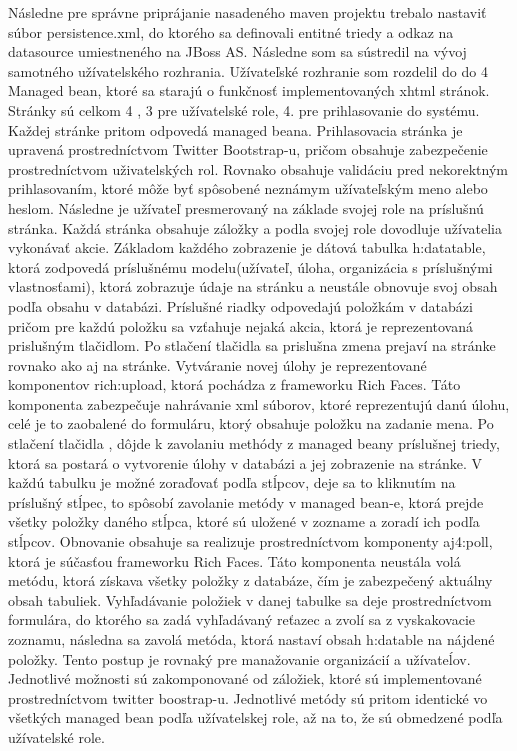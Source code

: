   Následne pre správne priprájanie nasadeného maven projektu trebalo nastaviť súbor persistence.xml, do ktorého sa definovali entitné triedy a odkaz na datasource umiestneného na JBoss AS. Následne som sa sústredil na vývoj samotného užívatelského rozhrania. Užívateľské rozhranie som rozdelil do do 4 Managed bean, ktoré sa starajú o funkčnosť implementovaných xhtml stránok. Stránky sú celkom 4 , 3 pre užívatelské role, 4. pre prihlasovanie do systému. Každej stránke pritom odpovedá managed beana. Prihlasovacia stránka je upravená prostredníctvom Twitter Bootstrap-u, pričom obsahuje zabezpečenie prostredníctvom uživatelských rol. Rovnako obsahuje validáciu pred nekorektným prihlasovaním, ktoré môže byť spôsobené neznámym užívateľským meno alebo heslom. Následne je užívateľ presmerovaný na základe svojej role na príslušnú stránka. Každá stránka obsahuje záložky a podla svojej role dovodluje užívatelia vykonávať akcie. Základom každého zobrazenie je dátová tabulka h:datatable, ktorá zodpovedá príslušnému modelu(užívateľ, úloha, organizácia s príslušnými vlastnosťami), ktorá zobrazuje údaje na stránku a neustále obnovuje svoj obsah podľa obsahu v databázi. Príslušné riadky odpovedajú položkám v databázi pričom pre každú položku sa vzťahuje nejaká akcia, ktorá je reprezentovaná prislušným tlačidlom. Po stlačení tlačidla sa prislušna zmena prejaví na stránke rovnako ako aj na stránke. Vytváranie novej úlohy je reprezentované komponentov rich:upload, ktorá pochádza z frameworku Rich Faces. Táto komponenta zabezpečuje nahrávanie xml súborov, ktoré reprezentujú danú úlohu, celé je to zaobalené do formuláru, ktorý obsahuje položku na zadanie mena. Po stlačení tlačidla , dôjde k zavolaniu methódy z managed beany príslušnej triedy, ktorá sa postará o vytvorenie úlohy v databázi a jej zobrazenie na stránke. V každú tabulku je možné zoraďovať podľa stĺpcov, deje sa to kliknutím na príslušný stĺpec, to spôsobí zavolanie metódy v managed bean-e, ktorá prejde všetky položky daného stĺpca, ktoré sú uložené v zozname a zoradí ich podľa stĺpcov. Obnovanie obsahuje sa realizuje prostredníctvom komponenty aj4:poll, ktorá je súčasťou frameworku Rich Faces. Táto komponenta neustála volá metódu, ktorá získava všetky položky z databáze, čím je zabezpečený aktuálny obsah tabuliek. Vyhľadávanie položiek v danej tabulke sa deje prostredníctvom formulára, do ktorého sa zadá vyhľadávaný reťazec a zvolí sa z vyskakovacie zoznamu, následna sa zavolá metóda, ktorá nastaví obsah h:datable na nájdené položky. Tento postup je rovnaký pre manažovanie organizácií a užívateĺov. Jednotlivé možnosti sú zakomponované od záložiek, ktoré sú implementované prostredníctvom twitter boostrap-u. Jednotlivé metódy sú pritom identické vo všetkých managed bean podľa užívatelskej role, až na to, že sú obmedzené podľa užívatelské role. 



